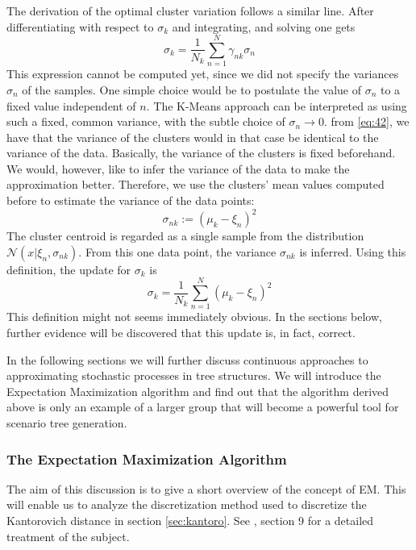 The derivation of the optimal cluster variation follows a similar line.
After differentiating with respect to $\sigma_k$ and integrating, and solving one gets
\begin{equation}
  \label{eq:42}
  \sigma_k = \frac{1}{N_k}\sum_{n=1}^N \gamma_{nk}\sigma_n
\end{equation}
This expression cannot be computed yet, since we did not specify the variances $\sigma_n$ of the samples.
One simple choice would be to postulate the value of $\sigma_n$ to a fixed value independent of $n$.
The K-Means approach can be interpreted as using such a fixed, common variance, with the subtle choice of $\sigma_n\rightarrow 0$.
from \eqref{eq:42}, we have that the variance of the clusters would in that case be identical to the variance of the data.
Basically, the variance of the clusters is fixed beforehand.
We would, however, like to infer the variance of the data to make the approximation better.
Therefore, we use the clusters' mean values computed before to estimate the variance of the data points:
\begin{equation}
  \label{eq:43}
  \sigma_{nk} := (\mu_k-\xi_n)^2
\end{equation}
The cluster centroid is regarded as a single sample from the distribution $\mathcal{N}(x|\xi_n, \sigma_{nk})$.
From this one data point, the variance $\sigma_{nk}$ is inferred.
Using this definition, the update for $\sigma_k$ is
\begin{equation}
  \label{eq:44}
  \sigma_k = \frac{1}{N_k}\sum_{n=1}^N (\mu_k-\xi_n)^2
\end{equation}
This definition might not seems immediately obvious.
In the sections below, further evidence will be discovered that this update is, in fact, correct.
%

In the following sections we will further discuss continuous approaches to approximating stochastic processes in tree structures.
We will introduce the Expectation Maximization algorithm and find out that the algorithm derived above is only an example of a larger group that will become a powerful tool for scenario tree generation.
\subsubsection{The Expectation Maximization Algorithm}
The aim of this discussion is to give a short overview of the concept of EM.
This will enable us to analyze the discretization method used to discretize the Kantorovich distance in section \ref{sec:kantoro}.
See \cite{Bishop2006}, section 9 for a detailed treatment of the subject.

